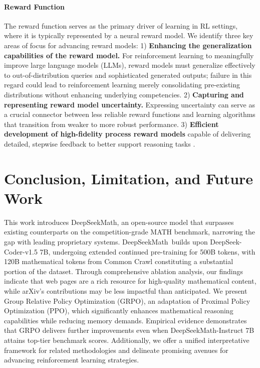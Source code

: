 \begin{itemize}[topsep=0pt]
\begin{itemize}[topsep=0pt]
\paragraph{Reward Function} The reward function serves as the primary driver of learning in RL settings, where it is typically represented by a neural reward model. We identify three key areas of focus for advancing reward models: 1) \textbf{Enhancing the generalization capabilities of the reward model.} For reinforcement learning to meaningfully improve large language models (LLMs), reward models must generalize effectively to out-of-distribution queries and sophisticated generated outputs; failure in this regard could lead to reinforcement learning merely consolidating pre-existing distributions without enhancing underlying competencies. 2) \textbf{Capturing and representing reward model uncertainty.} Expressing uncertainty can serve as a crucial connector between less reliable reward functions and learning algorithms that transition from weaker to more robust performance. 3) \textbf{Efficient development of high-fidelity process reward models} capable of delivering detailed, stepwise feedback to better support reasoning tasks \citep{lightman2023let,wang2023math}.

\section{Conclusion, Limitation, and Future Work} This work introduces DeepSeekMath, an open-source model that surpasses existing counterparts on the competition-grade MATH benchmark, narrowing the gap with leading proprietary systems. DeepSeekMath~builds upon DeepSeek-Coder-v1.5 7B, undergoing extended continued pre-training for 500B tokens, with 120B mathematical tokens from Common Crawl constituting a substantial portion of the dataset. Through comprehensive ablation analysis, our findings indicate that web pages are a rich resource for high-quality mathematical content, while arXiv's contributions may be less impactful than anticipated. We present Group Relative Policy Optimization (GRPO), an adaptation of Proximal Policy Optimization (PPO), which significantly enhances mathematical reasoning capabilities while reducing memory demands. Empirical evidence demonstrates that GRPO delivers further improvements even when DeepSeekMath-Instruct 7B attains top-tier benchmark scores. Additionally, we offer a unified interpretative framework for related methodologies and delineate promising avenues for advancing reinforcement learning strategies.


\end{itemize}
\end{itemize}
